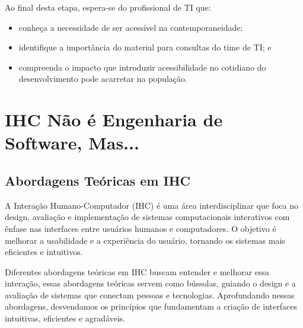 \documentclass[
  12pt,
  openright,
  twoside,
  a4paper,
  english,
  french,
  spanish,
  brazil
]{abntex2}
\begin{document}
Ao final desta etapa, espera-se do profissional de TI que:

\begin{itemize}
  \item conheça a necessidade de ser acessível na contemporaneidade;
  \item identifique a importância do material para consultas do time de TI; e
  \item
    compreenda o impacto que introduzir acessibilidade no cotidiano do
    desenvolvimento pode acarretar na população.
\end{itemize}

\chapter{IHC Não é Engenharia de Software, Mas...}

\section{Abordagens Teóricas em IHC}

A Interação Humano-Computador (IHC) é uma área interdisciplinar que foca no
design, avaliação e implementação de sistemas computacionais interativos com
ênfase nas interfaces entre usuários humanos e computadores. O objetivo é
melhorar a usabilidade e a experiência do usuário, tornando os sistemas mais
eficientes e intuitivos.

Diferentes abordagens teóricas em IHC buscam entender e melhorar essa interação,
essas abordagens teóricas servem como bússolas, guiando o design e a avaliação
de sistemas que conectam pessoas e tecnologias. Aprofundando nessas abordagens,
desvendamos os princípios que fundamentam a criação de interfaces intuitivas,
eficientes e agradáveis.
\end{document}
